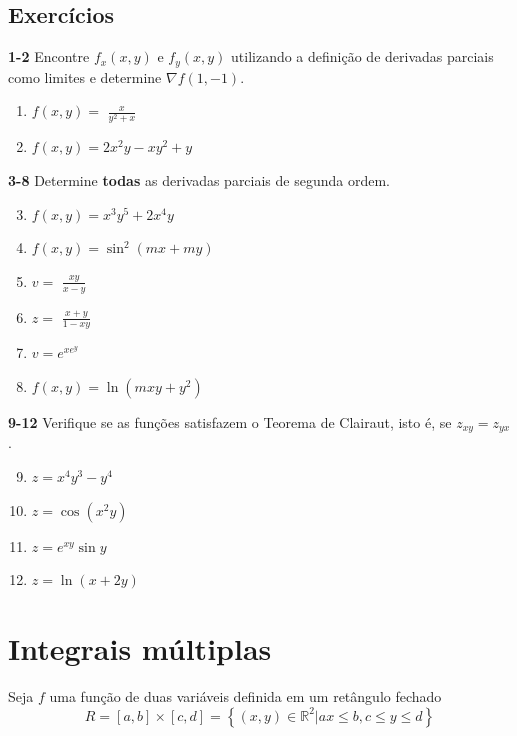 \documentclass[a4paper, 12pt]{extreport}
\begin{document}
      \section{Exercícios}
      {\color{astral}\textbf{1-2}} Encontre $f_x(x,y)$ e $f_y(x,y)$ utilizando a definição de derivadas parciais como limites e \hspace*{5mm} determine $\nabla f(1,-1)$.
        \begin{multicols}{2}
          \begin{enumerate}
            \item $f(x,y) =$ {\large$\frac{x}{y^2+x}$}
            \item $f(x,y) = 2x^2y - xy^2 + y$
          \end{enumerate}
        \end{multicols}
        {\color{astral}\textbf{3-8}} Determine \textbf{todas} as derivadas parciais de segunda ordem.
        \begin{multicols}{2}
          \begin{enumerate}
            \setcounter{enumi}{2}
            \item $f(x,y) = x^3y^5 + 2x^4y$
            \item $f(x,y) = \sin^2{(mx + my)}$
            \item $v =$ {\large$\frac{xy}{x-y}$}
            \item $z =$ {\large$\frac{x+y}{1-xy}$}
            \item $v = e^{xe^y}$
            \item $f(x,y) = \ln{(mxy+y^2)}$
          \end{enumerate}
        \end{multicols}
        {\color{astral}\textbf{9-12}} Verifique se as funções satisfazem o Teorema de Clairaut, isto é, se $z_{xy} = z_{yx}$.
        \begin{multicols}{2}
          \begin{enumerate}
            \setcounter{enumi}{8}
            \item $z = x^4y^3 - y^4$
            \item $z = \cos{(x^2y)}$
            \item $z = e^{xy}\sin{y}$
            \item $z = \ln{(x+2y)}$
          \end{enumerate}
        \end{multicols}


  \chapter{\texorpdfstring{Integrais múltiplas}{TEXT}{}}
    Seja $f$ uma função de duas variáveis definida em um retângulo fechado
    $$ R = [a,b] \times [c,d] = \left\{(x,y) \in \mathbb{R}^2 | a x \leqslant b, c \leqslant y \leqslant d \right\} $$
\end{document}
